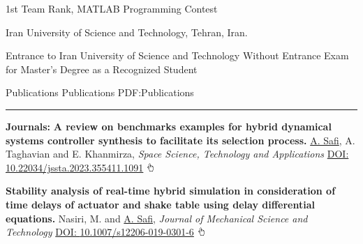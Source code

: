 \documentclass[letterpaper,MMMyyyy]{CVTemplate}
\begin{document}
\begin{Body}
\Gap
\vspace{6pt}
\BulletItem
1st Team Rank, MATLAB Programming Contest
\hfill
\textcolor{OrangeY}{}
\begin{Detail}
\Item
Iran University of Science and Technology, Tehran, Iran.
\end{Detail}

\Gap
\vspace{6pt}
\BulletItem
Entrance to Iran University of Science and Technology Without Entrance Exam for Master's Degree as a Recognized Student
\hfill
\textcolor{OrangeY}{}





\Section
{Publications}
{Publications}
{PDF:Publications}
\textcolor{Forestg}{\vspace{0.10cm}\hrule height 0.1cm}\BigGap\Gap
\begingroup
\BigGap
\textcolor{Forestg}{\textbf{Journals:}}
\vspace{4pt}
\BulletItem
\textbf{A review on benchmarks examples for hybrid dynamical systems controller synthesis to facilitate its selection process.}
\underline{A. Safi}, A. Taghavian and E. Khanmirza,
\textit{Space Science, Technology and Applications} 
\newline
\href{https://journal.isrc.ac.ir/article_164991.html?lang=en}{DOI: \textcolor{Forestg}{10.22034/jssta.2023.355411.1091}}
\includegraphics[height=9pt]{icons/hand-cursor.png}
\hfill
\textcolor{OrangeY}{}



\Gap\vspace{6pt}
\BulletItem
\textbf{Stability analysis of real-time hybrid simulation in consideration of time delays of actuator and shake table using delay differential equations.}
Nasiri, M. and \underline{A. Safi},
\textit{Journal of Mechanical Science and Technology}
\newline
\href{https://link.springer.com/article/10.1007/s12206-019-0301-6}{DOI: \textcolor{Forestg}{10.1007/s12206-019-0301-6}} \includegraphics[height=9pt]{icons/hand-cursor.png}
\hfill
\textcolor{OrangeY}{}


\end{Body}
\end{document}
